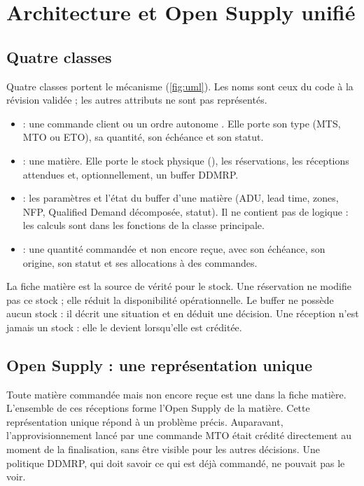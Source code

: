\chapter{Architecture et Open Supply unifié}\label{ch:architecture}

\section{Quatre classes}

Quatre classes portent le mécanisme (\cref{fig:uml}). Les noms sont ceux du code à la révision
validée ; les autres attributs ne sont pas représentés.

\begin{itemize}
  \item {} : une commande client ou un ordre autonome . Elle porte
    son type (MTS, MTO ou ETO), sa quantité, son échéance et son statut.
  \item {} : une matière. Elle porte le stock physique (), les
    réservations, les réceptions attendues et, optionnellement, un buffer DDMRP.
  \item {} : les paramètres et l'état du buffer d'une matière (ADU, lead time, zones,
    NFP, Qualified Demand décomposée, statut). Il ne contient pas de logique : les calculs sont
    dans les fonctions de la classe principale.
  \item {} : une quantité commandée et non encore reçue, avec son échéance,
    son origine, son statut et ses allocations à des commandes.
\end{itemize}



La fiche matière est la source de vérité pour le stock. Une réservation ne modifie pas ce stock ;
elle réduit la disponibilité opérationnelle. Le buffer ne possède aucun stock : il décrit une
situation et en déduit une décision. Une réception n'est jamais un stock : elle le devient lorsqu'elle
est créditée.

\section{Open Supply : une représentation unique}

Toute matière commandée mais non encore reçue est une  dans la fiche
matière. L'ensemble de ces réceptions forme l'Open Supply de la matière. Cette représentation
unique répond à un problème précis. Auparavant, l'approvisionnement lancé par une commande MTO
était crédité directement au moment de la finalisation, sans être visible pour les autres
décisions. Une politique DDMRP, qui doit savoir ce qui est déjà commandé, ne pouvait pas le voir.

